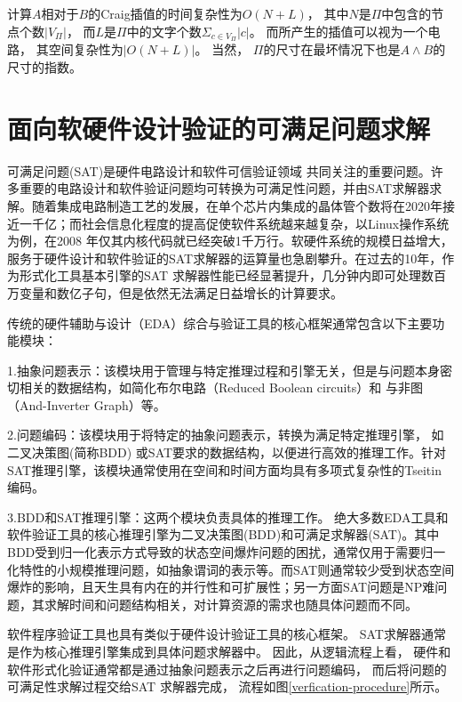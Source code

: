 计算$A$相对于$B$的Craig插值的时间复杂性为$O(N+L)$，
其中$N$是$\Pi$中包含的节点个数$|V_{\Pi}|$，
而$L$是$\Pi$中的文字个数$\Sigma _{c\in V_{\Pi}}|c|$。
而所产生的插值可以视为一个电路，
其空间复杂性为$|O(N+L)|$。
当然，
$\Pi$的尺寸在最坏情况下也是$A\wedge B$的尺寸的指数。



\section{面向软硬件设计验证的可满足问题求解}
可满足问题(SAT)是硬件电路设计和软件可信验证领域 共同关注的重要问题。许多重要的电路设计和软件验证问题均可转换为可满足性问题，并由SAT求解器求解。随着集成电路制造工艺的发展，在单个芯片内集成的晶体管个数将在2020年接近一千亿；而社会信息化程度的提高促使软件系统越来越复杂，以Linux操作系统为例，在2008 年仅其内核代码就已经突破1千万行。软硬件系统的规模日益增大，服务于硬件设计和软件验证的SAT求解器的运算量也急剧攀升。在过去的10年，作为形式化工具基本引擎的SAT 求解器性能已经显著提升，几分钟内即可处理数百万变量和数亿子句，但是依然无法满足日益增长的计算要求。

传统的硬件辅助与设计（EDA）综合与验证工具的核心框架通常包含以下主要功能模块：

1.抽象问题表示：该模块用于管理与特定推理过程和引擎无关，但是与问题本身密切相关的数据结构，如简化布尔电路（Reduced Boolean circuits）和
与非图（And-Inverter Graph）等。

2.问题编码：该模块用于将特定的抽象问题表示，转换为满足特定推理引擎，
如二叉决策图(简称BDD) 或SAT要求的数据结构，以便进行高效的推理工作。针对SAT推理引擎，该模块通常使用在空间和时间方面均具有多项式复杂性的Tseitin 编码。

3.BDD和SAT推理引擎：这两个模块负责具体的推理工作。
绝大多数EDA工具和软件验证工具的核心推理引擎为二叉决策图(BDD)和可满足求解器(SAT)。其中BDD受到归一化表示方式导致的状态空间爆炸问题的困扰，通常仅用于需要归一化特性的小规模推理问题，如抽象谓词的表示等。而SAT则通常较少受到状态空间爆炸的影响，且天生具有内在的并行性和可扩展性；另一方面SAT问题是NP难问题，其求解时间和问题结构相关，对计算资源的需求也随具体问题而不同。

软件程序验证工具也具有类似于硬件设计验证工具的核心框架。
SAT求解器通常是作为核心推理引擎集成到具体问题求解器中。
因此，从逻辑流程上看，
硬件和软件形式化验证通常都是通过抽象问题表示之后再进行问题编码，
而后将问题的可满足性求解过程交给SAT 求解器完成，
流程如图\ref{verfication-procedure}所示。

